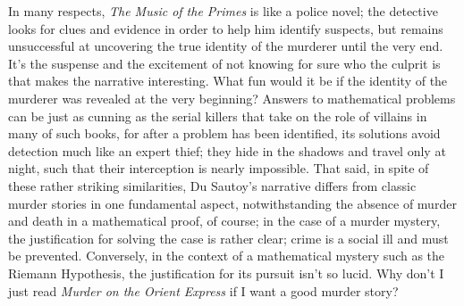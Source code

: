 \documentclass{mathbook}
\begin{document}
    In many respects, \emph{The Music of the Primes} is like a police novel; the detective looks for clues and evidence in order to help him identify suspects, but remains unsuccessful at uncovering the true identity of the murderer until the very end. It's the suspense and the excitement of not knowing for sure who the culprit is that makes the narrative interesting. What fun would it be if the identity of the murderer was revealed at the very beginning? Answers to mathematical problems can be just as cunning as the serial killers that take on the role of villains in many of such books, for after a problem has been identified, its solutions avoid detection much like an expert thief; they hide in the shadows and travel only at night, such that their interception is nearly impossible. That said, in spite of these rather striking similarities, Du Sautoy's narrative differs from classic murder stories in one fundamental aspect, notwithstanding the absence of murder and death in a mathematical proof, of course; in the case of a murder mystery, the justification for solving the case is rather clear; crime is a social ill and must be prevented. Conversely, in the context of a mathematical mystery such as the Riemann Hypothesis, the justification for its pursuit isn't so lucid. Why don't I just read \emph{Murder on the Orient Express} \cite{Christie1934} if I want a good murder story?
    
\end{document}
